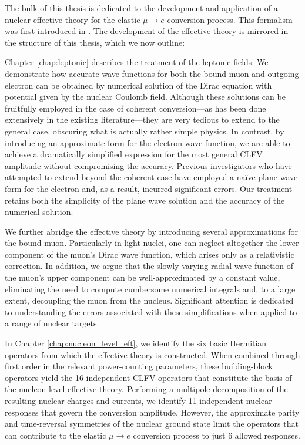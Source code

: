 \documentclass[12pt,letterpaper]{book}
\begin{document}
The bulk of this thesis is dedicated to the development and application of a nuclear effective theory for the elastic $\mu\rightarrow e$ conversion process. This formalism was first introduced in \cite{rule2021nucleonlevel,haxton_2022}. The development of the effective theory is mirrored in the structure of this thesis, which we now outline:

Chapter \ref{chap:leptonic} describes the treatment of the leptonic fields. We demonstrate how accurate wave functions for both the bound muon and outgoing electron can be obtained by numerical solution of the Dirac equation with potential given by the nuclear Coulomb field. Although these solutions can be fruitfully employed in the case of coherent conversion---as has been done extensively in the existing literature---they are very tedious to extend to the general case, obscuring what is actually rather simple physics. In contrast, by introducing an approximate form for the electron wave function, we are able to achieve a dramatically simplified expression for the most general CLFV amplitude without compromising the accuracy. Previous investigators who have attempted to extend beyond the coherent case have employed a na\"ive plane wave form for the electron and, as a result, incurred significant errors. Our treatment retains both the simplicity of the plane wave solution and the accuracy of the numerical solution.

We further abridge the effective theory by introducing several  approximations for the bound muon. Particularly in light nuclei, one can neglect altogether the lower component of the muon's Dirac wave function, which arises only as a relativistic correction. In addition, we argue that the slowly varying radial wave function of the muon's upper component can be well-approximated by a constant value, eliminating the need to compute cumbersome numerical integrals and, to a large extent, decoupling the muon from the nucleus. Significant attention is dedicated to understanding the errors associated with these simplifications when applied to a range of nuclear targets.

In Chapter \ref{chap:nucleon_level_eft}, we identify the six basic Hermitian operators from which the effective theory is constructed. When combined through first order in the relevant power-counting parameters, these building-block operators yield the 16 independent CLFV operators that constitute the basis of the nucleon-level effective theory. Performing a multipole decomposition of the resulting nuclear charges and currents, we identify 11 independent nuclear responses that govern the conversion amplitude. However, the approximate parity and time-reversal symmetries of the nuclear ground state limit the operators that can contribute to the elastic $\mu\rightarrow e$ conversion process to just 6 allowed responses. 
\end{document}
